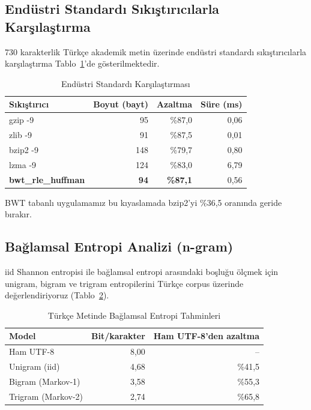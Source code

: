 \documentclass[conference]{IEEEtran}
\begin{document}
\subsection{Endüstri Standardı Sıkıştırıcılarla Karşılaştırma}

730 karakterlik Türkçe akademik metin üzerinde endüstri standardı sıkıştırıcılarla karşılaştırma Tablo~\ref{tab:industry}'de gösterilmektedir.

\begin{table}[h]
\caption{Endüstri Standardı Karşılaştırması}
\label{tab:industry}
\centering
\begin{tabular}{@{}lrrr@{}}
\toprule
Sıkıştırıcı & Boyut (bayt) & Azaltma & Süre (ms) \\
\midrule
gzip -9 & 95 & \%87,0 & 0,06 \\
zlib -9 & 91 & \%87,5 & 0,01 \\
bzip2 -9 & 148 & \%79,7 & 0,80 \\
lzma -9 & 124 & \%83,0 & 6,79 \\
\textbf{bwt\_rle\_huffman} & \textbf{94} & \textbf{\%87,1} & 0,56 \\
\bottomrule
\end{tabular}
\end{table}

BWT tabanlı uygulamamız bu kıyaslamada bzip2'yi \%36,5 oranında geride bırakır.

\subsection{Bağlamsal Entropi Analizi (n-gram)}

iid Shannon entropisi ile bağlamsal entropi arasındaki boşluğu ölçmek için unigram, bigram ve trigram entropilerini Türkçe corpus üzerinde değerlendiriyoruz (Tablo~\ref{tab:ngram}).

\begin{table}[h]
\caption{Türkçe Metinde Bağlamsal Entropi Tahminleri}
\label{tab:ngram}
\centering
\begin{tabular}{@{}lrr@{}}
\toprule
Model & Bit/karakter & Ham UTF-8'den azaltma \\
\midrule
Ham UTF-8 & 8,00 & -- \\
Unigram (iid) & 4,68 & \%41,5 \\
Bigram (Markov-1) & 3,58 & \%55,3 \\
Trigram (Markov-2) & 2,74 & \%65,8 \\
\bottomrule
\end{tabular}
\end{table}
\end{document}
